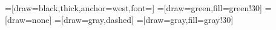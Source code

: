 \documentclass{thesis}
\begin{document}
\frontmatter
\maketitle
\clearpage
\impressum

\cleardoublepage


\cleardoublepage

%

\tableofcontents

\mainmatter

=[draw=black,thick,anchor=west,font=\small]
=[draw=green,fill=green!30]
=[draw=none]
=[draw=gray,dashed]
=[draw=gray,fill=gray!30]













\appendix





\backmatter			%

\listoftables



\clearpage
\erklaerung
\end{document}
